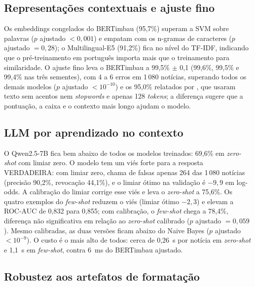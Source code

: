 \subsection{Representações contextuais e ajuste fino}

Os embeddings congelados do BERTimbau (95,7\%) superam a SVM sobre palavras ($p$ ajustado $< 0{,}001$) e empatam com os n-gramas de caracteres ($p$ ajustado $= 0{,}28$); o Multilingual-E5 (91,2\%) fica no nível do TF-IDF, indicando que o pré-treinamento em português importa mais que o treinamento para similaridade. O ajuste fino leva o BERTimbau a 99,5\% $\pm$ 0,1 (99,6\%, 99,5\% e 99,4\% nas três sementes), com 4 a 6 erros em 1\,080 notícias, superando todos os demais modelos ($p$ ajustado $< 10^{-10}$) e os 95,0\% relatados por \citet{pires2024}, que usaram texto sem acentos nem \emph{stopwords} e apenas 128 \emph{tokens}; a diferença sugere que a pontuação, a caixa e o contexto mais longo ajudam o modelo.

\subsection{LLM por aprendizado no contexto}

O Qwen2.5-7B fica bem abaixo de todos os modelos treinados: 69,6\% em \emph{zero-shot} com limiar zero. O modelo tem um viés forte para a resposta VERDADEIRA: com limiar zero, chama de falsas apenas 264 das 1\,080 notícias (precisão 90,2\%, revocação 44,1\%), e o limiar ótimo na validação é $-9{,}9$ em log-odds. A calibração do limiar corrige esse viés e leva o \emph{zero-shot} a 75,6\%. Os quatro exemplos do \emph{few-shot} reduzem o viés (limiar ótimo $-2{,}3$) e elevam a ROC-AUC de 0,832 para 0,855; com calibração, o \emph{few-shot} chega a 78,4\%, diferença não significativa em relação ao \emph{zero-shot} calibrado ($p$ ajustado $= 0{,}059$). Mesmo calibradas, as duas versões ficam abaixo do Naive Bayes ($p$ ajustado $< 10^{-9}$). O custo é o mais alto de todos: cerca de 0,26~s por notícia em \emph{zero-shot} e 1,1~s em \emph{few-shot}, contra 6~ms do BERTimbau ajustado.

\subsection{Robustez aos artefatos de formatação}

